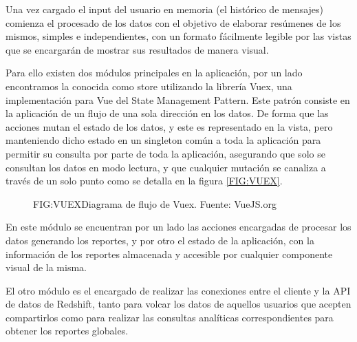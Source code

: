
Una vez cargado el input del usuario en memoria (el histórico de mensajes) comienza el procesado de los datos con el objetivo de elaborar resúmenes de los mismos, simples e independientes, con un formato fácilmente legible por las vistas que se encargarán de mostrar sus resultados de manera visual.

Para ello existen dos módulos principales en la aplicación, por un lado encontramos la conocida como store utilizando la librería Vuex, una implementación para Vue del State Management Pattern\cite{VueJS}. Este patrón consiste en la aplicación de un flujo de una sola dirección en los datos. De forma que las acciones mutan el estado de los datos, y este es representado en la vista, pero manteniendo dicho estado en un singleton común a toda la aplicación para permitir su consulta por parte de toda la aplicación, asegurando que solo se consultan los datos en modo lectura, y que cualquier mutación se canaliza a través de un solo punto como se detalla en la figura \ref{FIG:VUEX}.

\begin{figure}[Diagrama de flujo de Vuex]{FIG:VUEX}{Diagrama de flujo de Vuex. Fuente: VueJS.org}
\end{figure}

En este módulo se encuentran por un lado las acciones encargadas de procesar los datos generando los reportes, y por otro el estado de la aplicación, con la información de los reportes almacenada y accesible por cualquier componente visual de la misma.

El otro módulo es el encargado de realizar las conexiones entre el cliente y la API de datos de Redshift, tanto para volcar los datos de aquellos usuarios que acepten compartirlos como para realizar las consultas analíticas correspondientes para obtener los reportes globales.
